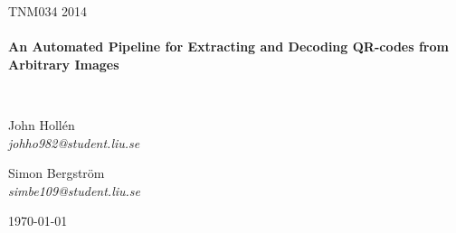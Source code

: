 \begin{titlepage}
\begin{center}
 
\textsc{\Large TNM034 2014}\\[0.5cm]
 
\HRule \\[0.4cm]
{ \huge \bfseries An Automated Pipeline for Extracting and Decoding QR-codes from Arbitrary Images \\[0.4cm] }
 
\HRule \\[1.5cm]
 
\begin{minipage}{0.4\textwidth}
\begin{flushleft} \large
John Holl\'en\\
\emph{johho982@student.liu.se}
\end{flushleft}
\end{minipage}
\begin{minipage}{0.4\textwidth}
\begin{flushright} \large
Simon Bergstr\"om\\
\emph{simbe109@student.liu.se}
\end{flushright}
\end{minipage}
 
\vfill
 
{\large \today}
 
\end{center}
\end{titlepage}